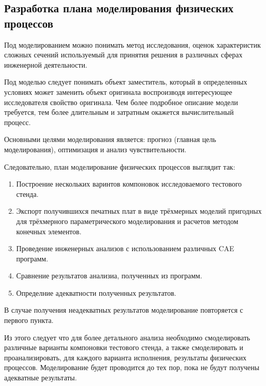 \subsection{Разработка плана моделирования физических процессов}

Под моделированием можно понимать метод исследования, оценок характеристик сложных сечений используемый для принятия решения в различных сферах инженерной деятельности.

Под моделью следует понимать объект заместитель, который в определенных условиях может заменить объект оригинала воспроизводя интересующее исследователя свойство оригинала. Чем более подробное описание модели требуется, тем более длительным и затратным окажется вычислительный
процесс.

Основными целями моделирования является: прогноз (главная цель моделирования), оптимизация и анализ чувствительности.

Следовательно, план моделирование физических процессов выглядит так:
\begin{enumerate}[label={\arabic*.}]
\item Построение нескольких варинтов компоновок исследоваемого тестового стенда.
\item Экспорт получившихся печатных плат в виде трёхмерных моделий пригодных для трёхмерного параметрического моделирования и расчетов методом конечных элементов.
\item Проведение инженерных анализов с использованием различных CAE программ.
\item Сравнение результатов анализиа, полученных из программ.
\item Определние адекватности полученных результатов.  
\end{enumerate}



В случае получения неадекватных результатов моделирование повторяется с первого пункта.

Из этого следует что для более детального анализа необходимо
смоделировать различные варианты компоновки тестового стенда, а также
смоделировать и проанализировать, для каждого варианта исполнения,
результаты физических процессов. Моделирование будет проводится до тех
пор, пока не будут получены адекватные результаты.
